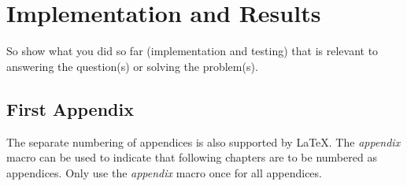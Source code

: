 \documentclass[11pt,a4paper,oneside]{book} %
\numberwithin{equation}{section}
\begin{document}
\chapter{Implementation and Results}
\label{c-results}

So show what you did so far (implementation and testing) that is relevant to
answering the question(s) or solving the problem(s).





% 
%
\printbibliography

\begin{appendix}
\chapter{First Appendix}
The separate numbering of appendices is also supported by LaTeX. The \textit{appendix} macro can be used to indicate that following chapters are to be numbered as appendices. Only use the \textit{appendix} macro once for all appendices.
\end{appendix}



\end{document}

